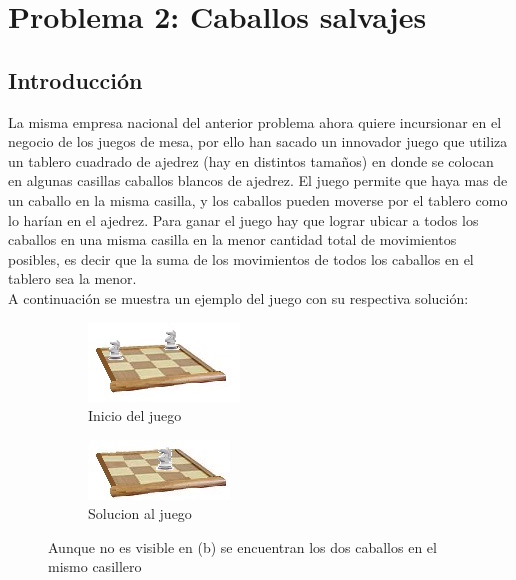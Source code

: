 \section{Problema 2: Caballos salvajes}

\subsection{Introducci\'on}
La misma empresa nacional del anterior problema ahora quiere incursionar en el negocio de los juegos de mesa, por ello han sacado un innovador juego que utiliza un tablero cuadrado de ajedrez (hay en distintos tamaños) en donde se colocan en algunas casillas caballos blancos de ajedrez. El juego permite que haya mas de un caballo en la misma casilla, y los caballos pueden moverse por el tablero como lo harían en el ajedrez. Para ganar el juego hay que lograr ubicar a todos los caballos en una misma casilla en la menor cantidad total de movimientos posibles, es decir que la suma de los movimientos de todos los caballos en el tablero sea la menor. \\
A continuación se muestra un ejemplo del juego con su respectiva solución: \\

%
%

\begin{figure}[H]
  \centering
		\begin{subfigure}[b]{0.3\textwidth}
                \includegraphics[scale=3]{Imagenes/Ej2/introCaballos}
                \caption{Inicio del juego}
                \label{fig:intro}
        \end{subfigure} 
  		\begin{subfigure}[b]{0.3\textwidth}
               \includegraphics[scale=3]{Imagenes/Ej2/introSolu}
                \caption{Solucion al juego}
                \label{fig:intro}
        \end{subfigure}
        \caption{Aunque no es visible en (b) se encuentran los dos caballos en el mismo casillero} 
\end{figure}


